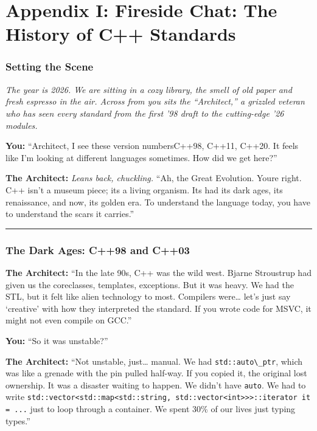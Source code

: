 \hypertarget{appendix-i-fireside-chat-the-history-of-c-standards}{%
\section{Appendix I: Fireside Chat: The History of C++
Standards}\label{appendix-i-fireside-chat-the-history-of-c-standards}}

\hypertarget{setting-the-scene}{%
\subsubsection{Setting the Scene}\label{setting-the-scene}}

\emph{The year is 2026. We are sitting in a cozy library, the smell of
old paper and fresh espresso in the air. Across from you sits the
``Architect,'' a grizzled veteran who has seen every standard from the
first '98 draft to the cutting-edge '26 modules.}

\textbf{You:} ``Architect, I see these version numbersC++98, C++11,
C++20. It feels like I'm looking at different languages sometimes. How
did we get here?''

\textbf{The Architect:} \emph{Leans back, chuckling.} ``Ah, the Great
Evolution. Youre right. C++ isn't a museum piece; its a living organism.
Its had its dark ages, its renaissance, and now, its golden era. To
understand the language today, you have to understand the scars it
carries.''

\begin{center}\rule{0.5\linewidth}{0.5pt}\end{center}

\hypertarget{the-dark-ages-c98-and-c03}{%
\subsubsection{The Dark Ages: C++98 and
C++03}\label{the-dark-ages-c98-and-c03}}

\textbf{The Architect:} ``In the late 90s, C++ was the wild west. Bjarne
Stroustrup had given us the coreclasses, templates, exceptions. But it
was heavy. We had the STL, but it felt like alien technology to most.
Compilers were\ldots{} let's just say `creative' with how they
interpreted the standard. If you wrote code for MSVC, it might not even
compile on GCC.''

\textbf{You:} ``So it was unstable?''

\textbf{The Architect:} ``Not unstable, just\ldots{} manual. We had
\passthrough{\lstinline!std::auto\_ptr!}, which was like a grenade with
the pin pulled half-way. If you copied it, the original lost ownership.
It was a disaster waiting to happen. We didn't have
\passthrough{\lstinline!auto!}. We had to write
\passthrough{\lstinline!std::vector<std::map<std::string, std::vector<int>>>::iterator it = ...!}
just to loop through a container. We spent 30\% of our lives just typing
types.''

